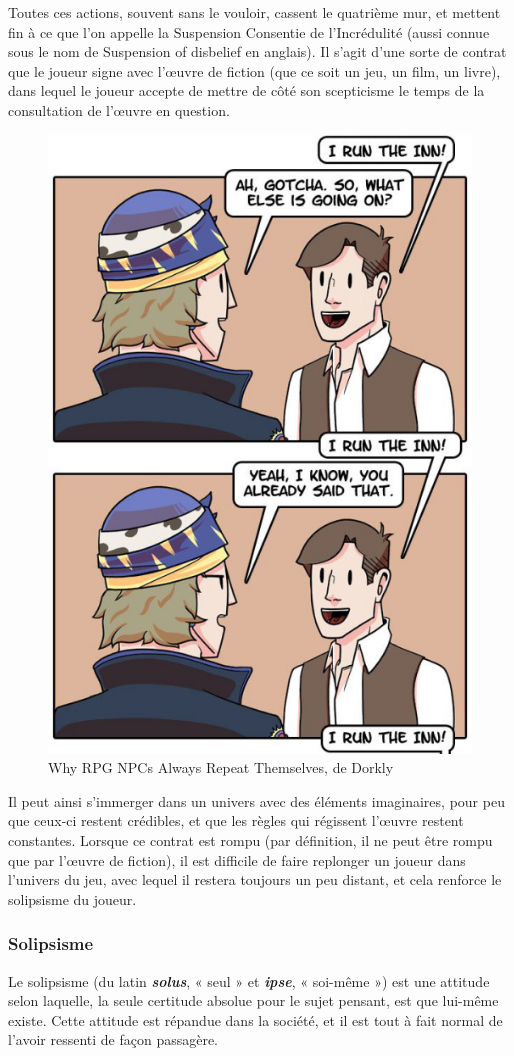 \documentclass[a4paper, 12pt]{article} %
\begin{document}
Toutes ces actions, souvent sans le vouloir, cassent le quatrième mur, et mettent fin à ce que l’on appelle la Suspension Consentie de l’Incrédulité (aussi connue sous le nom de Suspension of disbelief en anglais). Il s’agit d’une sorte de contrat que le joueur signe avec l’œuvre de fiction (que ce soit un jeu, un film, un livre), dans lequel le joueur accepte de mettre de côté son scepticisme le temps de la consultation de l’œuvre en question. 

\begin{figure}[!h]%
	\begin{center} 
		\includegraphics[width=0.40\columnwidth]{images/repeat2.png}%
		\caption{Why RPG NPCs Always Repeat Themselves, de Dorkly}%
	\end{center}
\end{figure}

Il peut ainsi s’immerger dans un univers avec des éléments imaginaires, pour peu que ceux-ci restent crédibles, et que les règles qui régissent l’œuvre restent constantes.
Lorsque ce contrat est rompu (par définition, il ne peut être rompu que par l’œuvre de fiction), il est difficile de faire replonger un joueur dans l’univers du jeu, avec lequel il restera toujours un peu distant, et cela renforce le solipsisme du joueur.

\newpage
\subsubsection{Solipsisme}

Le solipsisme (du latin \textbf{\textit{solus}}, « seul » et \textbf{\textit{ipse}}, « soi-même ») est une attitude selon laquelle, la seule certitude absolue pour le sujet pensant, est que lui-même existe. Cette attitude est répandue dans la société, et il est tout à fait normal de l’avoir ressenti de façon passagère.
\end{document}
